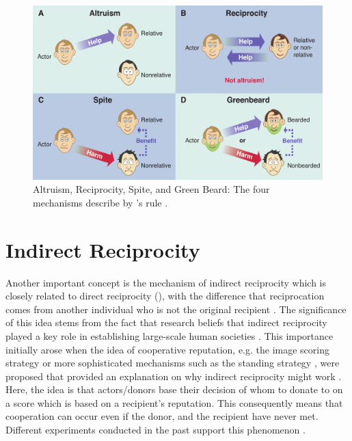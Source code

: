 \documentclass[sigconf]{acmart}
\begin{document}
    \begin{figure}
        \includegraphics[width=\columnwidth]{figures/mechanisms}
        \caption{Altruism, Reciprocity, Spite, and Green Beard: The four mechanisms describe by \citeauthor{hamilton_kin_1964}'s rule \cite{west_altruism_2010}.}
        \label{fig:mechanisms}
    \end{figure}


    \section{Indirect Reciprocity}\label{sec:indirect_reciprocity}
    Another important concept is the mechanism of indirect reciprocity which is closely related to direct reciprocity (), with the difference that reciprocation comes from another individual who is not the original recipient \cite{alexander_biology_1987,boyd_evolution_1989}.
    The significance of this idea stems from the fact that research beliefs that indirect reciprocity played a key role in establishing large-scale human societies \cite{roberts_kin_2019}.
    This importance initially arose when the idea of cooperative reputation, e.g. the image scoring strategy or more sophisticated mechanisms such as the standing strategy \cite{leimar_evolution_2001,ohtsuki_leading_2006}, were proposed that provided an explanation on why indirect reciprocity might work \cite{nowak_evolution_1998}.
    Here, the idea is that actors/donors base their decision of whom to donate to on a score which is based on a recipient's reputation.
    This consequently means that cooperation can occur even if the donor, and the recipient have never met.
    Different experiments conducted in the past support this phenomenon \cite{nowak_five_2006, milinski_cooperation_2002, milinski_reputation_2002,milinski_reputation_2016}.
\end{document}
